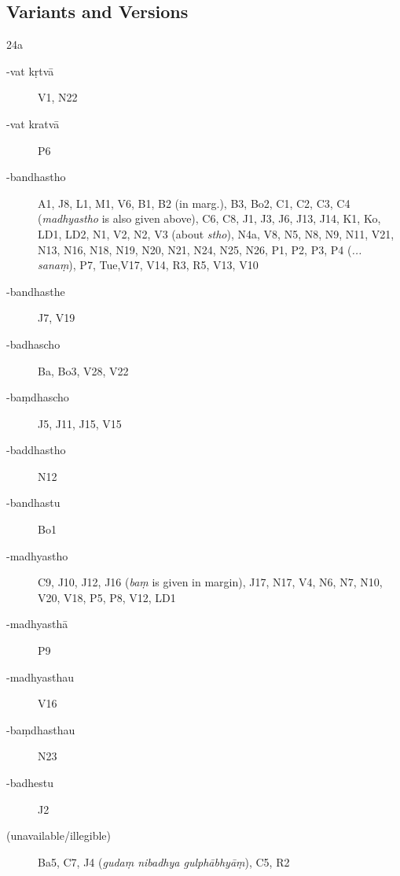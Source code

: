 ﻿

\newcommand{\myfn}[1]{\footnote{\texteng{#1}}}
\setlength{\footmarkwidth}{1.3em}
\setlength{\footmarksep}{0em}
\setlength{\footparindent}{1.3em}
\usepackage{fnpos}
\makeFNbottom

\def\sthana{}


\pagestyle{HPed} %
\begin{ekdosis}

 \chapter{Variants and Versions}

\sthana{24a}

 \begin{marma}[hp01_024]
        \begin{description}
        \item[-vat kṛtvā]{V1, N22}
        \item[-vat kratvā]{P6}
        \item[-bandhastho]{A1, J8, L1, M1, V6, B1, B2 (in marg.), B3, Bo2, C1, C2, C3, C4
           (\emph{madhyastho} is also given above), C6, C8, J1, J3, J6, J13, J14, K1, Ko, LD1, LD2, N1, V2, N2,
           V3 (about \emph{stho}), N4a, V8, N5, N8, N9, N11, V21, N13, N16, N18, N19, N20, N21, N24,
           N25, N26, P1, P2, P3, P4 (\emph{... sanaṃ}), P7, Tue,V17, V14, R3, R5, V13, V10}
        \item[-bandhasthe]{J7, V19}
        \item[-badhascho]{Ba, Bo3, V28, V22}
        \item[-baṃdhascho]{J5, J11, J15, V15}
        \item[-baddhastho]{N12}
        \item[-bandhastu]{Bo1}
        \item[-madhyastho]{C9, J10, J12, J16 (\emph{baṃ} is given in margin), J17, N17, V4, N6, N7,
           N10, V20, V18, P5, P8, V12, LD1}
        \item[-madhyasthā]{P9}
        \item[-madhyasthau]{V16}
        \item[-baṃdhasthau]{N23}
        \item[-badhestu]{J2}
        \item[(unavailable/illegible)]{Ba5, C7, J4 (\emph{gudaṃ nibadhya gulphābhyāṃ}), C5, R2}
        \end{description}
\end{marma}



\end{ekdosis}
